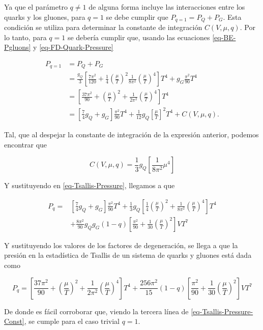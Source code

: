 Ya que el parámetro $q \neq 1$ de alguna forma incluye las interacciones entre los quarks y los gluones, para $q=1$ se debe cumplir que ${P}_{q=1} = {P}_{Q} + {P}_{G}$. Esta condición se utiliza para determinar la constante de integración $C(V,\mu,q)$. Por lo tanto, para $q = 1$ se debería cumplir que, usando las ecuaciones \eqref{eq-BE-Pgluons} y \eqref{eq-FD-Quark-Pressure}

\begin{equation}\label{eq-Tsallis-Pressure-Const}
\begin{split}
{P}_{q=1} & = {P}_{Q} + {P}_{G}\\
& = \frac{{g}_{Q}}{3} \left[\frac{7 {\pi}^{2}}{120} + \frac{1}{4} \left(\frac{\mu}{T} \right)^{2} \frac{1}{8{\pi}^{2}} \left(\frac{\mu}{T} \right)^{4} \right] {T}^{4} + {g}_{G} \frac{{\pi}^{2}}{90}{T}^{4} \\
& = \left[\frac{37{\pi}^{2}}{90} + \left(\frac{\mu}{T} \right)^{2} + \frac{1}{2{\pi}^{2}}\left( \frac{\mu}{T}\right)^{4} \right]{T}^{4} \\
& = \left[\frac{7}{4} {g}_{Q} + {g}_{G} \right] \frac{{\pi}^{2}}{90} {T}^{4} + \frac{1}{12}{g}_{Q} \left[\frac{\mu}{T}\right]^{2}{T}^{4} + C(V,\mu,q).
\end{split}
\end{equation}

Tal, que al despejar la constante de integración de la expresión anterior, podemos encontrar que

\begin{equation}
C(V,\mu,q) = \frac{1}{3}{g}_{Q} \left[\frac{1}{8{\pi}^{2}} {\mu}^{4} \right]
\end{equation}

Y sustituyendo en \eqref{eq-Tsallis-Pressure}, llegamos a que

\begin{equation}
\begin{split}
{P}_{q} = & \left[\frac{7}{4} {g}_{Q} + {g}_{G} \right] \frac{{\pi}^{2}}{90} {T}^{4} + \frac{1}{3}{g}_{Q} \left[\frac{1}{4} \left(\frac{\mu}{T} \right)^{2} + \frac{1}{8{\pi}^{2}} \left(\frac{\mu}{T} \right)^{4} \right]{T}^{4}\\
& + \frac{8{\pi}^{2}}{90} {g}_{Q}{g}_{G}(1-q) \left[\frac{{\pi}^{2}}{90} + \frac{1}{30} \left( \frac{\mu}{T}\right)^{2}\right]V{T}^{7} 
\end{split}
\end{equation}

Y sustituyendo los valores de los factores de degeneración, se llega a que la presión en la estadística de Tsallis de un sistema de quarks y gluones está dada como

\begin{equation}
{P}_{q} = \left[\frac{37{\pi}^{2}}{90} + \left(\frac{\mu}{T} \right)^{2} + \frac{1}{2{\pi}^{2}} \left(\frac{\mu}{T} \right)^{4} \right]{T}^{4} + \frac{256{\pi}^{2}}{15}(1-q) \left[\frac{{\pi}^{2}}{90} + \frac{1}{30} \left(\frac{\mu}{T} \right)^{2} \right]V{T}^{7}
\end{equation}

De donde es fácil corroborar que, viendo la tercera línea de \eqref{eq-Tsallis-Pressure-Const}, se cumple para el caso trivial ${q}=1$.